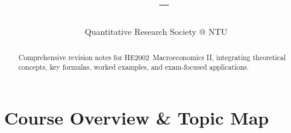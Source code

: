 \documentclass[12pt]{article}
\title{%
\vspace{-0.5cm}
{\Large\bfseries \CourseCode\ \CourseName{} -- \DocType}
}
\author{Quantitative Research Society @ NTU}
\date{\AcademicYear}
\newcommand{\CourseCode}{HE2002}
\newcommand{\CourseName}{Macroeconomics II}
\begin{document}
\maketitle
\thispagestyle{plainfirst}

\begin{abstract}
\noindent
Comprehensive revision notes for \CourseCode\ \CourseName, integrating theoretical concepts, key formulas, worked examples, and exam-focused applications.
\end{abstract}

\vspace{0.5cm}
\tableofcontents
\newpage

\fontsize{10.5pt}{11.5pt}\selectfont
\pagestyle{main}

\section*{Course Overview \& Topic Map}
\end{document}
